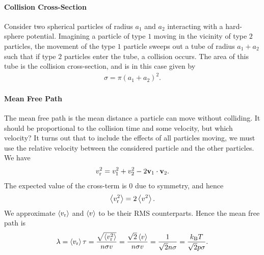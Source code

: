 \paragraph{Collision Cross-Section}
Consider two spherical particles of radius $a_{1}$ and $a_{2}$ interacting with a hard-sphere potential. Imagining a particle of type $1$ moving in the vicinity of type $2$ particles, the movement of the type $1$ particle sweeps out a tube of radius $a_{1} + a_{2}$ such that if type $2$ particles enter the tube, a collision occurs. The area of this tube is the collision cross-section, and is in this case given by
\begin{align*}
	\sigma = \pi(a_{1} + a_{2})^{2}.
\end{align*}

\paragraph{Mean Free Path}
The mean free path is the mean distance a particle can move without colliding. It should be proportional to the collision time and some velocity, but which velocity? It turns out that to include the effects of all particles moving, we must use the relative velocity between the considered particle and the other particles. We have
\begin{align*}
	v_{\text{r}}^{2} = v_{1}^{2} + v_{2}^{2} - 2\vb{v}_{1}\cdot\vb{v}_{2}.
\end{align*}
The expected value of the cross-term is $0$ due to symmetry, and hence
\begin{align*}
	\expval{v_{\text{r}}^{2}} = 2\expval{v^{2}}.
\end{align*}
We approximate $\expval{v_{\text{r}}}$ and $\expval{v}$ to be their RMS counterparts. Hence the mean free path is
\begin{align*}
	\lambda = \expval{v_{\text{r}}}\tau = \frac{\sqrt{\expval{v_{\text{r}}^{2}}}}{n\sigma v} = \frac{\sqrt{2}\expval{v}}{n\sigma v} = \frac{1}{\sqrt{2}n\sigma} = \frac{k_{\text{B}} T}{\sqrt{2}p\sigma}.
\end{align*}

